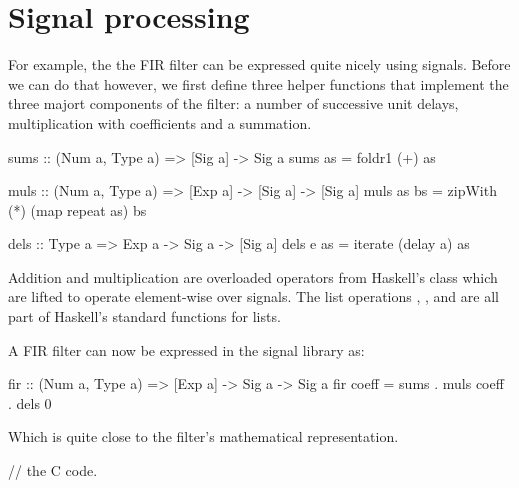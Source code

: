 \documentclass[../main.tex]{subfiles}
\begin{document}
\chapter{Signal processing}

For example, the the FIR filter can be expressed quite nicely using signals. Before we can do that however, we first define three helper functions that implement the three majort components of the filter: a number of successive unit delays, multiplication with coefficients and a summation.

\begin{code}
sums :: (Num a, Type a) => [Sig a] -> Sig a
sums as = foldr1 (+) as

muls :: (Num a, Type a) => [Exp a] -> [Sig a] -> [Sig a]
muls as bs = zipWith (*) (map repeat as) bs

dels :: Type a => Exp a -> Sig a -> [Sig a]
dels e as = iterate (delay a) as
\end{code}

\noindent Addition and multiplication are overloaded operators from Haskell's  class which are lifted to operate element-wise over signals. The list operations , , and  are all part of Haskell's standard functions for lists.

A FIR filter can now be expressed in the signal library as:

\begin{code}
fir :: (Num a, Type a) => [Exp a] -> Sig a -> Sig a
fir coeff = sums . muls coeff . dels 0
\end{code}

\noindent Which is quite close to the filter's mathematical representation.


\begin{code}
// the C code.
\end{code}
\end{document}
